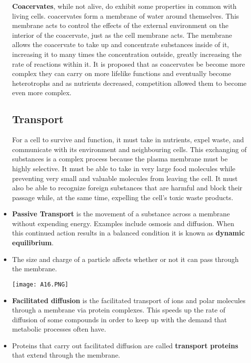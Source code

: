 \documentclass[letterpaper]{article}
\begin{document}
\begin{itemize}
\begin{review}
\end{review}
\begin{lab}
    \textbf{Coacervates}, while not alive, do exhibit some properties in common with living cells. coacervates form a membrane of water around themselves. This membrane acts to control the effects of the external environment on the interior of the coacervate, just as the cell membrane acts. The membrane allows the coacervate to take up and concentrate substances inside of it, increasing it to many times the concentration outside, greatly increasing the rate of reactions within it. It is proposed that as coacervates be become more complex they can carry on more lifelike functions and eventually become heterotrophs and as nutrients decreased, competition allowed them to become even more complex.
\end{lab}
\subsection{Transport}
\begin{idea}
    For a cell to survive and function, it must take in nutrients, expel waste, and communicate with its environment and neighbouring cells. This exchanging of substances is a complex process because the plasma membrane must be highly selective. It must be able to take in very large food molecules while preventing very small and valuable molecules from leaving the cell. It must also be able to recognize foreign substances that are harmful and block their passage while, at the same time, expelling the cell’s toxic waste products. 
\end{idea}
\item \textbf{Passive Transport} is the movement of a substance across a membrane without expending energy. Examples include osmosis and diffusion. When this continued action results in a balanced condition it is known as \textbf{dynamic equilibrium}.
\item The size and charge of a particle affects whether or not it can pass through the membrane.
\begin{center}\texttt{[image: A16.PNG]}\end{center}
\item \textbf{Facilitated diffusion} is the facilitated transport of ions and polar molecules through a membrane via protein complexes. This speeds up the rate of diffusion of some compounds in order to keep up with the demand that metabolic processes often have.
\item Proteins that carry out facilitated diffusion are called \textbf{transport proteins} that extend through the membrane.

\end{itemize}
\end{document}

